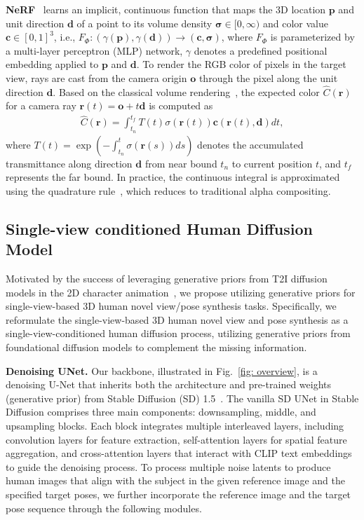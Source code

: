 \noindent \textbf{NeRF}~\cite{mildenhall2021nerf} learns an implicit, continuous function that maps the 3D location $\bm{p}$ and unit direction $\bm{d}$ of a point to its volume density $\bm{\sigma} \in [0, \infty)$ and color value $\bm{c}\in [0,1]^3$, i.e., $F_{\Phi}: (\gamma(\bm{p}), \gamma(\bm{d})) \to (\bm{c}, \bm{\sigma})$, where $F_{\Phi}$ is parameterized by a multi-layer perceptron (MLP) network, $\gamma$ denotes a predefined positional embedding applied to $\bm{p}$ and $\bm{d}$.
To render the RGB color of pixels in the target view, rays are cast from the camera origin $\bm{o}$ through the pixel along the unit direction $\bm{d}$. 
Based on the classical volume rendering~\cite{kajiya1984ray}, the expected color $\hat{C}(\bm{r})$ for a camera ray $\bm{r}(t) = \bm{o} + t\bm{d}$ is computed as 
\begin{equation}
\label{eqn:volume_rendering}
\begin{aligned}
\hat{C}(\bm{r})=\int_{t_n}^{t_f} T(t) \sigma(\bm{r}(t)) \bm{c}(\bm{r}(t), \bm{d})dt,
\end{aligned}
\end{equation}
where $T(t)=\exp(-\int_{t_n}^{t}\sigma(\bm{r}(s))ds)$ denotes the accumulated transmittance along direction $\bm{d}$ from near bound $t_n$ to current position $t$, and $t_f$ represents the far bound.
In practice, the continuous integral is approximated using the quadrature rule~\cite{max1995optical}, which reduces to traditional alpha compositing.




\subsection{Single-view conditioned Human Diffusion Model}
\label{sec:architecture}
Motivated by the success of leveraging generative priors from T2I diffusion models in the 2D character animation~\cite{hu2024animate}, we propose utilizing generative priors for single-view-based 3D human novel view/pose synthesis tasks. 
Specifically, we reformulate the single-view-based 3D human novel view and pose synthesis as a single-view-conditioned human diffusion process, utilizing generative priors from foundational diffusion models to complement the missing information.

\noindent \textbf{Denoising UNet.} 
Our backbone, illustrated in Fig.~\ref{fig: overview}, is a denoising U-Net that inherits both the architecture and pre-trained weights (generative prior) from Stable Diffusion (SD) 1.5~\cite{rombach2022high}.
The vanilla SD UNet in Stable Diffusion comprises three main components: downsampling, middle, and upsampling blocks.
Each block integrates multiple interleaved layers, including convolution layers for feature extraction, self-attention layers for spatial feature aggregation, and cross-attention layers that interact with CLIP text embeddings to guide the denoising process.
To process multiple noise latents to produce human images that align with the subject in the given reference image and the specified target poses, we further incorporate the reference image and the target pose sequence through the following modules.

